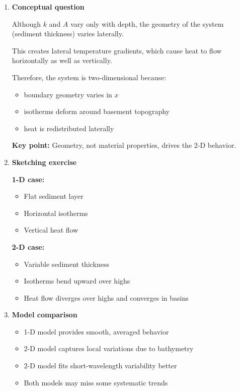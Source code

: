 \documentclass[final,a4paper,12pt]{article}
\begin{document}
\begin{enumerate}
Finite difference approximation:

\begin{equation}
q_j \approx -k_{1,j} \frac{T_{2,j} - T_{1,j}}{\Delta z}
\end{equation}

\item \textbf{Conceptual question}

Although $k$ and $A$ vary only with depth, the geometry of the system
(sediment thickness) varies laterally.

This creates lateral temperature gradients, which cause heat to flow
horizontally as well as vertically.

Therefore, the system is two-dimensional because:
\begin{itemize}
\item boundary geometry varies in $x$
\item isotherms deform around basement topography
\item heat is redistributed laterally
\end{itemize}

\textbf{Key point:} Geometry, not material properties, drives the 2-D behavior.

\item \textbf{Sketching exercise}

\textbf{1-D case:}
\begin{itemize}
\item Flat sediment layer
\item Horizontal isotherms
\item Vertical heat flow
\end{itemize}

\textbf{2-D case:}
\begin{itemize}
\item Variable sediment thickness
\item Isotherms bend upward over highs
\item Heat flow diverges over highs and converges in basins
\end{itemize}

\item \textbf{Model comparison}

\begin{itemize}
\item 1-D model provides smooth, averaged behavior
\item 2-D model captures local variations due to bathymetry
\item 2-D model fits short-wavelength variability better
\item Both models may miss some systematic trends
\end{itemize}


\end{enumerate}
\end{document}
